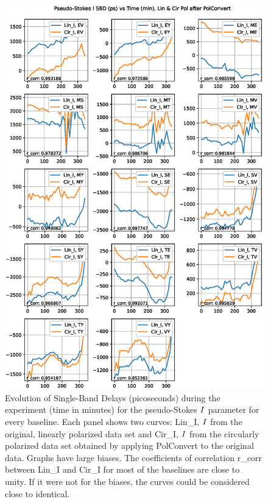 \documentclass[letterpaper,twoside,12pt]{article}
\begin{document}
\begin{figure}[ht!]
  \begin{center}
  \includegraphics[width=33pc]{SBD_Lin_I_and_Cir_I.eps}
  \caption{\small Evolution of Single-Band Delays (picoseconds) during the experiment (time in minutes) for the pseudo-Stokes $\protect I$ parameter for every baseline. Each panel shows two curves: Lin\_I, $\protect I$ from the original, linearly polarized data set and Cir\_I, $\protect I$ from the circularly polarized data set obtained by applying PolConvert to the original data. Graphs have large biases. The coefficients of correlation r\_corr between Lin\_I and Cir\_I for most of the baselines are close to unity. If it were not for the biases, the curves could be considered close to identical.}
  \label{sbd_lin_and_cir}
  \end{center}
\end{figure}
\end{document}
